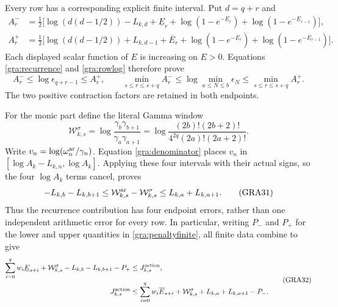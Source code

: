 \documentclass[11pt,a4paper]{article}
\begin{document}
Every row has a corresponding explicit finite interval.  Put $d=q+r$ and
\[
 \begin{aligned}
 A_r^-&=\tfrac12\bigl[\log(d(d-1/2))-L_{k,d}
 +\underline E_r+\log(1-e^{-\underline E_r})
 +\log(1-e^{-\underline E_{r-1}})\bigr],\\
 A_r^+&=\tfrac12\bigl[\log(d(d-1/2))+L_{k,d-1}
 +\overline E_r+\log(1-e^{-\overline E_r})
 +\log(1-e^{-\overline E_{r-1}})\bigr].
 \end{aligned}
\]
Each displayed scalar function of $E$ is increasing on $E>0$.
Equations \eqref{gra:recurrence} and \eqref{gra:rowlog} therefore prove
\begin{equation}
 A_r^-\le\log\epsilon_{q+r-1}\le A_r^+,\qquad
 \min_{s\le r\le s+q}A_r^-
 \le\log\min_{a\le N\le b}\epsilon_N
 \le\min_{s\le r\le s+q}A_r^+.
 \tag{GRA29}\label{gra:minfinite}
\end{equation}
The two positive contraction factors are retained in both endpoints.

For the monic part define the literal Gamma window
\begin{equation}
 \mathcal W_{k,s}^{\sigma}
 =\log\frac{\gamma_b\gamma_{b+1}}{\gamma_a\gamma_{a+1}}
 =\log\frac{(2b)!(2b+2)!}{4^{2q}(2a)!(2a+2)!}.
 \tag{GRA30}\label{gra:Wgamma}
\end{equation}
Write $v_n=\log(\omega_n^{\rm ar}/\gamma_n)$.
Equation \eqref{gra:denominator} places $v_n$ in
$[\log A_k-L_{k,n},\log A_k]$.  Applying these four intervals with
their actual signs, so the four $\log A_k$ terms cancel, proves
\begin{equation}
 -L_{k,b}-L_{k,b+1}\le
 \mathcal W_{k,s}^{\rm ar}-\mathcal W_{k,s}^{\sigma}
 \le L_{k,a}+L_{k,a+1}.
 \tag{GRA31}\label{gra:Wfour}
\end{equation}
Thus the recurrence contribution has four endpoint errors, rather than
one independent arithmetic error for every row.  In particular, writing
$P_-$ and $P_+$ for the lower and upper quantities in
\eqref{gra:penaltyfinite}, all finite data combine to give
\begin{equation}
 \begin{aligned}
 \sum_{i=0}^qw_i\underline E_{s+i}+\mathcal W_{k,s}^{\sigma}
       -L_{k,b}-L_{k,b+1}-P_+
 &\le J_{k,s}^{\rm action},\\
 J_{k,s}^{\rm action}&\le
 \sum_{i=0}^qw_i\overline E_{s+i}+\mathcal W_{k,s}^{\sigma}
       +L_{k,a}+L_{k,a+1}-P_-.
 \end{aligned}\tag{GRA32}\label{gra:Jfinite}
\end{equation}
\end{document}
